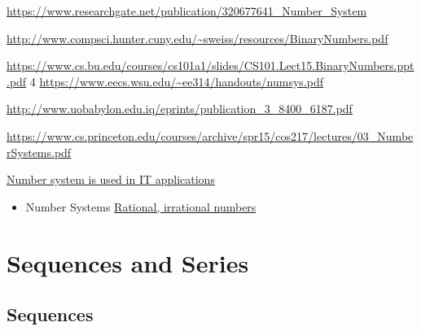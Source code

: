 \documentclass[]{book}
\providecommand{\tightlist}{%
  \setlength{\itemsep}{0pt}\setlength{\parskip}{0pt}}
\begin{document}
\url{https://www.researchgate.net/publication/320677641_Number_System}

\url{http://www.compsci.hunter.cuny.edu/~sweiss/resources/BinaryNumbers.pdf}

\url{https://www.cs.bu.edu/courses/cs101a1/slides/CS101.Lect15.BinaryNumbers.ppt.pdf}
4
\url{https://www.eecs.wsu.edu/~ee314/handouts/numsys.pdf}

\url{http://www.uobabylon.edu.iq/eprints/publication_3_8400_6187.pdf}

\url{https://www.cs.princeton.edu/courses/archive/spr15/cos217/lectures/03_NumberSystems.pdf}

\href{https://www.ukessays.com/essays/social-work/number-system-is-used-in-it-applications-social-work-essay.php}{Number system is used in IT applications}

\begin{itemize}
\tightlist
\item
  Number Systems \href{https://www.topperlearning.com/ncert-solutions/cbse-class-9-mathematics/mathematics-ix/number-systems}{Rational, irrational numbers}
\end{itemize}

\hypertarget{sequences-and-series}{%
\chapter{Sequences and Series}\label{sequences-and-series}}

\hypertarget{sequences}{%
\section{Sequences}\label{sequences}}
\end{document}
